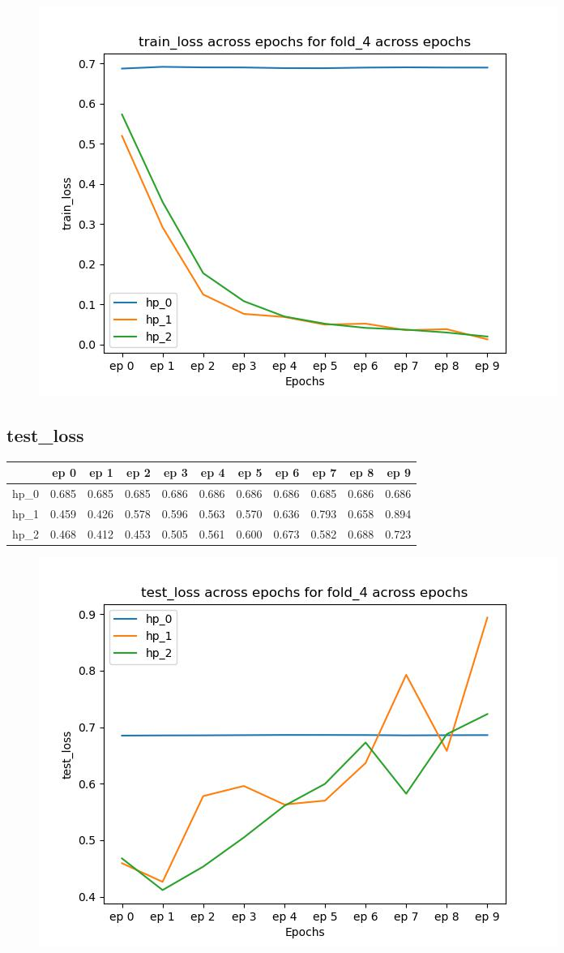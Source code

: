 \documentclass{article}
\begin{document}
\begin{figure}[H]
\includegraphics[scale = 0.75]{fold_4/train_loss}
\end{figure}
\subsection{test\_loss}
\begin{tabular}{lrrrrrrrrrr}
\toprule
{} &   ep 0 &   ep 1 &   ep 2 &   ep 3 &   ep 4 &   ep 5 &   ep 6 &   ep 7 &   ep 8 &   ep 9 \\
\midrule
hp\_0 &  0.685 &  0.685 &  0.685 &  0.686 &  0.686 &  0.686 &  0.686 &  0.685 &  0.686 &  0.686 \\
hp\_1 &  0.459 &  0.426 &  0.578 &  0.596 &  0.563 &  0.570 &  0.636 &  0.793 &  0.658 &  0.894 \\
hp\_2 &  0.468 &  0.412 &  0.453 &  0.505 &  0.561 &  0.600 &  0.673 &  0.582 &  0.688 &  0.723 \\
\bottomrule
\end{tabular}

\begin{figure}[H]
\includegraphics[scale = 0.75]{fold_4/test_loss}
\end{figure}
\end{document}
